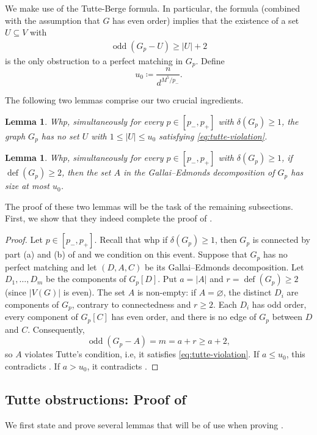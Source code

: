 \documentclass[notitlepage]{scrartcl}
\newtheorem{lemma}[thm]{Lemma}
\newcommand{\defi}{\operatorname{def}}
\newcommand{\odd}{\operatorname{odd}}
\begin{document}
We make use of the Tutte-Berge formula. In particular, the formula (combined with the assumption that $G$ has even order) implies that the existence of a set $U \subseteq V$ with
\begin{align} \label{eq:tutte-violation}
    \odd(G_p - U) \geq |U|+2
\end{align}
is the only obstruction to a perfect matching in $G_p$.
Define
\[
 u_0\coloneqq \frac{n}{d^{M^5/p_-}}.
\]

The following two lemmas comprise our two crucial ingredients.

\begin{lemma}\label{lem:no-small-tutte}
Whp, simultaneously for every $p\in[p_-,p_+]$ with $\delta(G_p)\ge1$, the graph $G_p$ has no set $U$ with $1\le|U|\le u_0$ satisfying \eqref{eq:tutte-violation}.
\end{lemma}

\begin{lemma}\label{lem:large-ge}
Whp, simultaneously for every $p\in[p_-,p_+]$ with $\delta(G_p)\ge1$, if $\defi(G_p)\ge2$, then the set $A$ in the Gallai--Edmonds decomposition of $G_p$ has size at most $u_0$.
\end{lemma}

The proof of these two lemmas will be the task of the remaining subsections. First, we show that they indeed complete the proof of .

\begin{proof}
Let $p \in [p_-, p_+]$. Recall that whp if $\delta(G_p)\geq 1$, then $G_p$ is connected by part (a) and (b) of  and we condition on this event.
Suppose that $G_p$ has no perfect matching and let $(D,A,C)$ be its Gallai--Edmonds decomposition.
Let $D_1,\ldots,D_m$ be the components of $G_p[D]$.
Put $a=|A|$ and $r=\defi(G_p)\ge2$ (since $|V(G)|$ is even).
The set $A$ is non-empty: if $A=\varnothing$, the distinct $D_i$ are components of $G_p$, contrary to connectedness and $r\ge2$.
Each $D_i$ has odd order, every component of $G_p[C]$ has even order, and there is no edge of $G_p$ between $D$ and $C$.
Consequently,
\[
 \odd(G_p-A)=m=a+r\ge a+2,
\]
so $A$ violates Tutte's condition, i.e, it satisfies \eqref{eq:tutte-violation}.
If $a\le u_0$, this contradicts .
If $a>u_0$, it contradicts .
\end{proof}


\subsection{Tutte obstructions: Proof of }
We first state and prove several lemmas that will be of use when proving .
\end{document}
